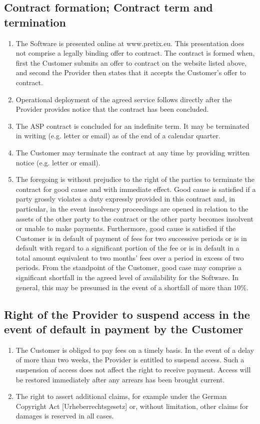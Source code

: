 \documentclass{terms}
\begin{document}
\subsection{Contract formation; Contract term and termination}
\begin{enumerate}
\item The Software is presented online at www.pretix.eu. This presentation does not comprise a legally binding offer to contract. The contract is formed when, first the Customer submits an offer to contract on the website listed above, and second the Provider then states that it accepts the Customer's offer to contract. 
\item Operational deployment of the agreed service follows directly after the Provider provides notice that the contract has been concluded.
\item The ASP contract is concluded for an indefinite term. It may be terminated in writing (e.g. letter or email) as of the end of a calendar quarter.
\item The Customer may terminate the contract at any time by providing written notice (e.g. letter or email).
\item The foregoing is without prejudice to the right of the parties to terminate the contract for good cause and with immediate effect. Good cause is satisfied if a party grossly violates a duty expressly provided in this contract and, in particular, in the event insolvency proceedings are opened in relation to the assets of the other party to the contract or the other party becomes insolvent or unable to make payments. Furthermore, good cause is satisfied if the Customer is in default of payment of fees for two successive periods or is in default with regard to a significant portion of the fee or is in default in a total amount equivalent to two months' fees over a period in excess of two periods. From the standpoint of the Customer, good case may comprise a significant shortfall in the agreed level of availability for the Software. In general, this may be presumed in the event of a shortfall of more than 10\%.
\end{enumerate}
\subsection{Right of the Provider to suspend access in the event of default in payment by the Customer}
\begin{enumerate}
\item The Customer is obliged to pay fees on a timely basis. In the event of a delay of more than two weeks, the Provider is entitled to suspend access. Such a suspension of access does not affect the right to receive payment. Access will be restored immediately after any arrears has been brought current.
\item The right to assert additional claims, for example under the German Copyright Act [Urheberrechtsgesetz] or, without limitation, other claims for damages is reserved in all cases.
\end{enumerate}
\end{document}
